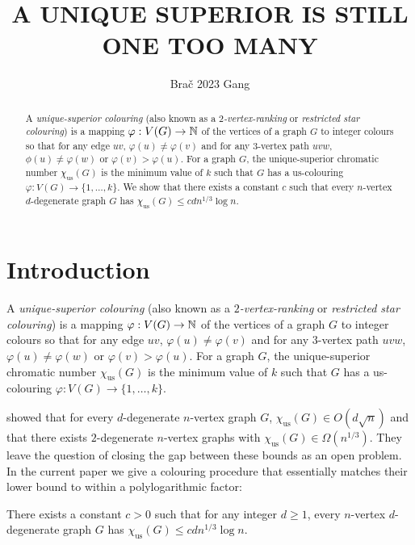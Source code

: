 \documentclass{patmorin}
\title{\MakeUppercase{A Unique Superior is Still One Too Many}}
\author{Bra\v{c} 2023 Gang}
\newcommand{\defin}[1]{\emph{\color{brightmaroon}#1}}
\newcommand{\trn}{\chi_{\mathrm{us}}}
\begin{document}
\maketitle

\begin{abstract}
  A \defin{unique-superior colouring} (also known as a \defin{$2$-vertex-ranking} or \defin{restricted star colouring}) is a mapping $\varphi:V(G)\to\mathbb{N}$ of the vertices of a graph $G$ to integer colours so that for any edge $uv$, $\varphi(u)\neq \varphi(v)$ and for any $3$-vertex path $uvw$, $\phi(u)\neq\varphi(w)$ or $\varphi(v)>\varphi(u)$.  For a graph $G$, the unique-superior chromatic number $\trn(G)$ is the minimum value of $k$ such that $G$ has a us-colouring $\varphi:V(G)\to\{1,\ldots,k\}$.  We show that there exists a constant $c$ such that every $n$-vertex $d$-degenerate graph $G$ has $\trn(G) \le cd n^{1/3}\log n$.
\end{abstract}


%



\section{Introduction}

A \defin{unique-superior colouring} (also known as a \defin{$2$-vertex-ranking} or \defin{restricted star colouring}) is a mapping $\varphi:V(G)\to\mathbb{N}$ of the vertices of a graph $G$ to integer colours so that for any edge $uv$, $\varphi(u)\neq \varphi(v)$ and for any $3$-vertex path $uvw$, $\varphi(u)\neq\varphi(w)$ or $\varphi(v)>\varphi(u)$.  For a graph $G$, the unique-superior chromatic number $\trn(G)$ is the minimum value of $k$ such that $G$ has a us-colouring $\varphi:V(G)\to\{1,\ldots,k\}$.

\citet{karpas.neiman.ea:on} showed that for every $d$-degenerate $n$-vertex graph $G$, $\trn(G)\in O(d\sqrt{n})$ and that there exists $2$-degenerate $n$-vertex graphs with $\trn(G)\in\Omega(n^{1/3})$.  They leave the question of closing the gap between these bounds as an open problem. In the current paper we give a colouring procedure that essentially matches their lower bound to within a polylogarithmic factor:

\begin{thm}\label{d_degenerate_upper_bound}
  There exists a constant $c>0$ such that for any integer $d\ge 1$, every $n$-vertex $d$-degenerate graph $G$ has $\trn(G) \le c d n^{1/3}\log  n$.
\end{thm}
\end{document}
